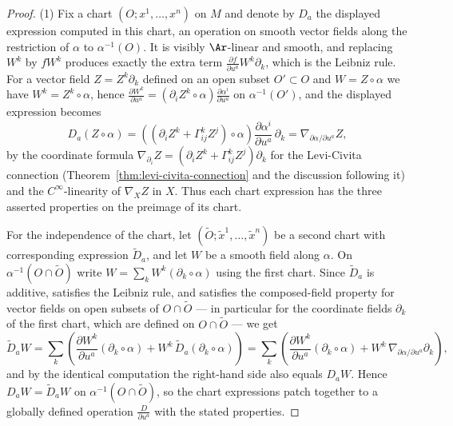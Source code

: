 \begin{proof}
\leanok
{}
(1) Fix a chart $(O;x^1,\ldots,x^n)$ on $M$ and denote by $D_a$ the
displayed expression computed in this chart, an operation on smooth
vector fields along the restriction of $\alpha$ to $\alpha^{-1}(O)$. It
is visibly $\Ar$-linear and smooth, and replacing $W^k$ by $fW^k$
produces exactly the extra term $\frac{\partial f}{\partial
u^a}W^k\partial_k$, which is the Leibniz rule. For a vector field
$Z=Z^k\partial_k$ defined on an open subset $O'\subset O$ and
$W=Z\circ\alpha$ we have $W^k=Z^k\circ\alpha$, hence $\frac{\partial
W^k}{\partial u^a}=\left(\partial_iZ^k\circ\alpha\right)\frac{\partial
\alpha^i}{\partial u^a}$ on $\alpha^{-1}(O')$, and the displayed
expression becomes
$$D_a(Z\circ\alpha)
=\left(\left(\partial_iZ^k+\Gamma^k_{ij}Z^j\right)\circ\alpha\right)
\frac{\partial\alpha^i}{\partial u^a}\,\partial_k
=\nabla_{\partial\alpha/\partial u^a}Z,$$
by the coordinate formula
$\nabla_{\partial_i}Z=\left(\partial_iZ^k+\Gamma^k_{ij}Z^j\right)\partial_k$
for the Levi-Civita connection (Theorem~\ref{thm:levi-civita-connection}
and the discussion following it) and the $C^\infty$-linearity of
$\nabla_XZ$ in $X$. Thus each chart expression has the three asserted
properties on the preimage of its chart.

For the independence of the chart, let $(\widetilde
O;\tilde x^1,\ldots,\tilde x^n)$ be a second chart with corresponding
expression $\widetilde D_a$, and let $W$ be a smooth field along
$\alpha$. On $\alpha^{-1}(O\cap\widetilde O)$ write
$W=\sum_kW^k(\partial_k\circ\alpha)$ using the first chart. Since
$\widetilde D_a$ is additive, satisfies the Leibniz rule, and satisfies
the composed-field property for vector fields on open subsets of
$O\cap\widetilde O$ --- in particular for the coordinate fields
$\partial_k$ of the first chart, which are defined on $O\cap\widetilde
O$ --- we get
$$\widetilde D_aW
=\sum_k\left(\frac{\partial W^k}{\partial u^a}(\partial_k\circ\alpha)
+W^k\,\widetilde D_a(\partial_k\circ\alpha)\right)
=\sum_k\left(\frac{\partial W^k}{\partial u^a}(\partial_k\circ\alpha)
+W^k\,\nabla_{\partial\alpha/\partial u^a}\partial_k\right),$$
and by the identical computation the right-hand side also equals
$D_aW$. Hence $D_aW=\widetilde D_aW$ on $\alpha^{-1}(O\cap\widetilde
O)$, so the chart expressions patch together to a globally defined
operation $\frac{D}{\partial u^a}$ with the stated properties.


\end{proof}
